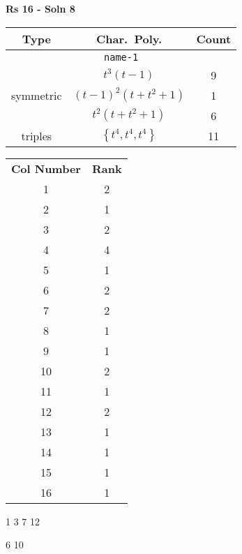 \documentclass{article}
\begin{document}
    \textbf{Rs 16 - Soln 8}
    \begin{table}
    \begin{tabular}{|c|c|c|}
    \hline
    \textbf{Type} & \textbf{Char.~Poly.} & \textbf{Count} \\
    \hline \multicolumn{3}{|c|}{\texttt{name-1}} \\ \hline
    \multirow{3}{*}{symmetric}
    & $t^3(t - 1)$ & 9 \\
    & $(t - 1)^2(t + t^2 + 1)$ & 1 \\
    & $t^2(t + t^2 + 1)$ & 6 \\
    \hline
    \multirow{1}{*}{triples}
    & $\left\{t^4,t^4,t^4\right\}$ & 11 \\
    \hline
    \end{tabular}
    \end{table}
    \begin{table}
    \begin{tabular}{|c|c|}
    \hline
    \textbf{Col Number} & \textbf{Rank}\\
    1 & 2 \\ 
    2 & 1 \\ 
    3 & 2 \\ 
    4 & 4 \\ 
    5 & 1 \\ 
    6 & 2 \\ 
    7 & 2 \\ 
    8 & 1 \\ 
    9 & 1 \\ 
    10 & 2 \\ 
    11 & 1 \\ 
    12 & 2 \\ 
    13 & 1 \\ 
    14 & 1 \\ 
    15 & 1 \\ 
    16 & 1 \\ 
    \hline
    \end{tabular}
    \end{table}
    1 3 7 12

    6 10

    \newpage
\end{document}
